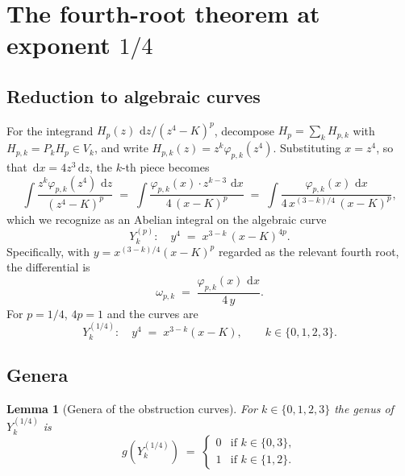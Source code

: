 \documentclass[11pt,a4paper]{article}
\theoremstyle{plain}
\newtheorem{lemma}[theorem]{Lemma}
\theoremstyle{definition}
\theoremstyle{remark}
\renewcommand{\d}{\,\mathrm{d}}
\begin{document}
\section{The fourth-root theorem at exponent \texorpdfstring{$1/4$}{1/4}}\label{sec:p14}

\subsection*{Reduction to algebraic curves}

For the integrand $H_p(z)\,\d z / (z^4 - K)^p$, decompose $H_p = \sum_k H_{p,k}$ with $H_{p,k} = P_k H_p \in V_k$, and write $H_{p,k}(z) = z^k \varphi_{p,k}(z^4)$. Substituting $x = z^4$, so that $\d x = 4 z^3 \d z$, the $k$-th piece becomes
\[
  \int \frac{z^k \varphi_{p,k}(z^4)\,\d z}{(z^4 - K)^p}
  \;=\; \int \frac{\varphi_{p,k}(x) \cdot z^{k-3}\,\d x}{4\,(x - K)^p}
  \;=\; \int \frac{\varphi_{p,k}(x)\,\d x}{4\,x^{(3-k)/4}\,(x - K)^p},
\]
which we recognize as an Abelian integral on the algebraic curve
\begin{equation}\label{eq:Ykp}
  Y_k^{(p)}\colon \quad y^4 \;=\; x^{3-k}\,(x - K)^{4p}.
\end{equation}
Specifically, with $y = x^{(3-k)/4}(x-K)^p$ regarded as the relevant fourth root, the differential is
\[
  \omega_{p,k} \;=\; \frac{\varphi_{p,k}(x)\,\d x}{4\,y}.
\]
For $p = 1/4$, $4p = 1$ and the curves are
\[
  Y_k^{(1/4)}\colon \quad y^4 \;=\; x^{3-k}(x - K), \qquad k \in \{0, 1, 2, 3\}.
\]

\subsection*{Genera}

\begin{lemma}[Genera of the obstruction curves]\label{lem:genera}
For $k \in \{0, 1, 2, 3\}$ the genus of $Y_k^{(1/4)}$ is
\[
  g(Y_k^{(1/4)}) \;=\; \begin{cases} 0 & \text{if } k \in \{0, 3\}, \\ 1 & \text{if } k \in \{1, 2\}. \end{cases}
\]
\end{lemma}
\end{document}
